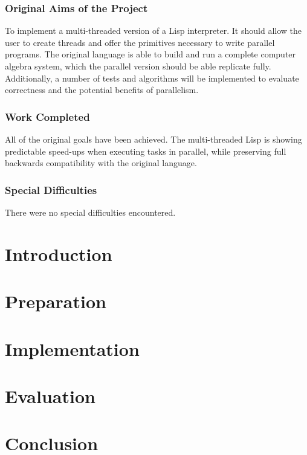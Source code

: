\documentclass[a4paper,12pt,twoside,openright]{report}
\begin{document}
\subsection*{Original Aims of the Project}

To implement a multi-threaded version of a Lisp interpreter. It should
allow the user to create threads and offer the primitives necessary to
write parallel programs. The original language is able to build and
run a complete computer algebra system, which the parallel version should
be able replicate fully. Additionally, a number of tests and algorithms will
be implemented to evaluate correctness and the potential benefits of parallelism.

\subsection*{Work Completed}

All of the original goals have been achieved. The multi-threaded Lisp
is showing predictable speed-ups when executing tasks in parallel,
while preserving full backwards compatibility with the original language.

\subsection*{Special Difficulties}
There were no special difficulties encountered.

\newpage

\setcounter{tocdepth}{2}
\tableofcontents

\newpage

\setcounter{page}{0}

\chapter{Introduction}


\chapter{Preparation}


\chapter{Implementation}


\chapter{Evaluation}


\chapter{Conclusion}



\newpage




\newpage

\appendix
\end{document}
